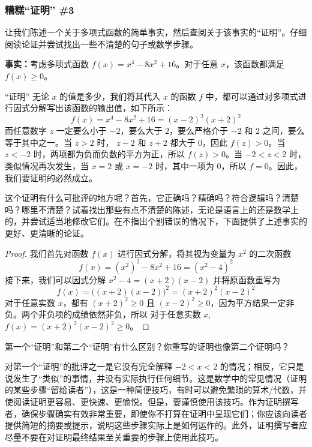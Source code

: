 \subsubsection*{糟糕“证明” \#3}

让我们陈述一个关于多项式函数的简单事实，然后查阅关于该事实的“证明”。仔细阅读论证并尝试找出一些不清楚的句子或数学步骤。

\textbf{事实：}考虑多项式函数 $f(x) = x^4-8x^2+16$。对于任意 $x$，该函数都满足 $f(x) \ge 0$。

\begin{proofs}{“证明”}
    无论 $x$ 的值是多少，我们将其代入 $x$ 的函数 $f$ 中，都可以通过对多项式进行因式分解写出该函数的输出值，如下所示：
    \[f(x) = x^4-8x^2+16 = (x-2)^2(x+2)^2\]
    而任意数字 $z$ 一定要么小于 $-2$，要么大于 $2$，要么严格介于 $-2$ 和 $2$ 之间，要么等于其中之一。当 $z > 2$ 时， $z - 2$ 和 $z + 2$ 都大于 $0$，因此 $f(z) > 0$。当 $z < -2$ 时，两项都为负而负数的平方为正，所以 $f(z) > 0$。当 $-2 < z < 2$ 时，类似情况再次发生，当 $x = 2$ 或 $x = -2$ 时，其中一项为 $0$，所以 $f = 0$。因此，我们要证明的必然成立。
\end{proofs}

这个证明有什么可批评的地方呢？首先，它正确吗？精确吗？符合逻辑吗？清楚吗？哪里不清楚？试着找出那些有点不清楚的陈述，无论是语言上的还是数学上的，并尝试适当地修改它们。在不指出个别错误的情况下，下面提供了上述事实的更好、更清晰的论证。

\begin{proof}
    我们首先对函数 $f(x)$ 进行因式分解，将其视为变量为 $x^2$ 的二次函数
    \[f(x) = (x^2)^2-8x^2+16 = (x^2-4)^2\]
    接下来，我们可以因式分解 $x^2-4=(x+2)(x-2)$ 并将原函数重写为
    \[f(x) = \big((x+2)(x-2)\big)^2 = (x+2)^2(x-2)^2\]
    对于任意实数 $x$，都有 $(x+2)^2 \ge 0$ 且 $(x-2)^2 \ge 0$，因为平方结果一定非负。两个非负项的成绩依然非负，所以 对于任意实数 $x$, $f(x) = (x+2)^2(x-2)^2 \ge 0$。
\end{proof}

第一个“证明”和第二个“证明”有什么区别？你重写的证明也像第二个证明吗？

对第一个“证明”的批评之一是它没有完全解释 $-2 < x < 2$ 的情况；相反，它只是说发生了“类似”的事情，并没有实际执行任何细节。这是数学中的常见情况（证明的某些步骤“留给读者”），这是一种简便技巧，有时可以避免繁琐的算术/代数，并使阅读证明更容易、更快速、更愉悦。但是，要谨慎使用该技巧。作为证明撰写者，确保步骤确实有效非常重要，即使你不打算在证明中呈现它们；你应该向读者提供简短的摘要或提示，说明这些步骤实际上是如何运作的。此外，证明撰写者应尽量不要在对证明最终结果至关重要的步骤上使用此技巧。

